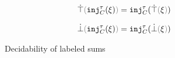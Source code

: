 
\begin{figure}[ht]

  \begin{align*}
    \ctruify{\cinj{C}{\tau}{\xi}} & = \cinj{C}{\tau}{\ctruify{\xi}}
  \end{align*}


  \begin{align*}
    \cfalsify{\cinj{C}{\tau}{\xi}} & = \cinj{C}{\tau}{\cfalsify{\xi}}
  \end{align*}

  \judgbox{\cincon{\Xi}}{}

  \begin{mathpar}



  \end{mathpar}

  \caption{Decidability of labeled sums}
  \label{fig:labeled-sums-decidability}
\end{figure}
